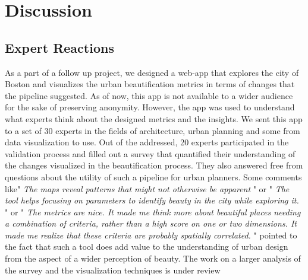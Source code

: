 \section{Discussion}

\subsection{Expert Reactions}

As a part of a follow up project, we designed a web-app that explores the city of Boston and visualizes the urban beautification metrics in terms of changes that the pipeline suggested. As of now, this app is not available to a wider audience for the sake of preserving anonymity. However, the app was used to understand what experts think about the designed metrics and the insights. We sent this app to a set of 30 experts in the fields of architecture, urban planning and some from data visualization to use. Out of the addressed, 20 experts participated in the validation process and filled out a survey that quantified their understanding of the changes visualized in the beautification process. They also answered free from questions about the utility of such a pipeline for urban planners. Some comments like" \textit{The maps reveal patterns that might not otherwise be apparent} " or " \textit{The tool helps focusing on parameters to identify beauty in the city while exploring it.} " or " \textit{The metrics are nice. It made me think more about beautiful places needing a combination of criteria, rather than a high score on one or two dimensions. It made me realize that these criteria are probably spatially correlated.} " pointed to the fact that such a tool does add value to the understanding of urban design from the aspect of a wider perception of beauty. The work on a larger analysis of the survey and the visualization techniques is under review

